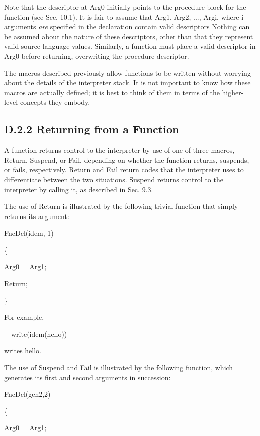 Note that the descriptor at Arg0 initially points to the procedure
block for the function (see Sec. 10.1). It is fair to assume that
Arg1, Arg2, ..., Argi, where i arguments \textit{are} specified in the
declaration contain valid descriptors Nothing can be assumed about the
nature of these descriptors, other than that they represent valid
source-language values. Similarly, a function must place a valid
descriptor in Arg0 before returning, overwriting the procedure
descriptor.

The macros described previously allow functions to be written without
worrying about the details of the interpreter stack. It is not
important to know how these macros are actually defined; it is best to
think of them in terms of the higher-level concepts they embody.

\subsection[D.2.2 Returning from a Function]{D.2.2 Returning from a Function}

A function returns control to the interpreter by use of one of three
macros, Return, Suspend, or Fail, depending on whether the function
returns, suspends, or fails, respectively. Return and Fail return
codes that the interpreter uses to differentiate between the two
situations. Suspend returns control to the interpreter by calling it,
as described in Sec. 9.3.

The use of Return is illustrated by the following trivial function
that simply returns its argument:

{\ttfamily\mdseries
FncDcl(idem, 1)}

{\ttfamily\mdseries
\{}

{\ttfamily\mdseries
Arg0 = Arg1;}

{\ttfamily\mdseries
Return;}

{\ttfamily\mdseries
\}}


For example,

{\ttfamily\mdseries
\ \ write(idem({\textquotedbl}hello{\textquotedbl}))}

\noindent writes hello.

The use of Suspend and Fail is illustrated by the following function,
which generates its first and second arguments in succession:

{\ttfamily\mdseries
FncDcl(gen2,2)}

{\ttfamily\mdseries
\{}

{\ttfamily\mdseries
Arg0 = Arg1;}

